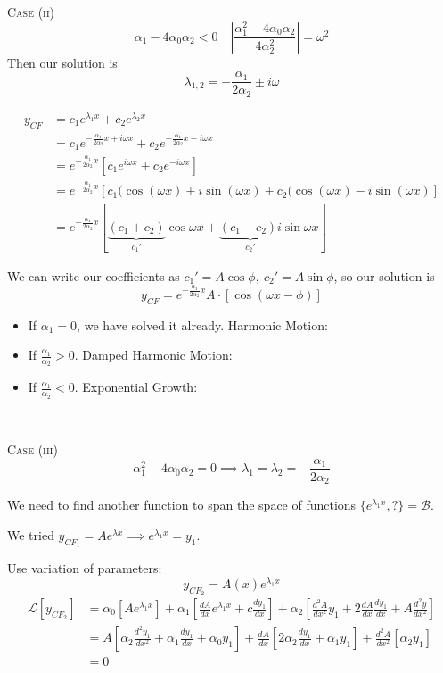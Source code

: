 \documentclass[10pt]{scrartcl}
\begin{document}
\textsc{Case (ii)}
\[\alpha_1-4\alpha_0\alpha_2 < 0 \quad \left|\frac{\alpha_1^2-4\alpha_0\alpha_2}{4\alpha_2^2}\right| = \omega^2\]
Then our solution is
\[\lambda_{1,2} = -\frac{\alpha_1}{2\alpha_2} \pm i\omega\]

\[
\begin{aligned}
  y_{CF} &= c_1e^{\lambda_1x} + c_2e^{\lambda_2x}\\
  &= c_1 e^{-\frac{\alpha_1}{2\alpha_2}x + i\omega x} + c_2 e^{-\frac{\alpha_1}{2\alpha_2}x - i\omega x}\\
  &= e^{-\frac{\alpha_1}{2\alpha_2}x}[c_1e^{i\omega x} + c_2e^{-i\omega x}]\\
  &= e^{-\frac{\alpha_1}{2\alpha_2}x}\left[c_1(\cos(\omega x) + i\sin(\omega x) + c_2(\cos(\omega x) - i\sin(\omega x)\right]\\
  &= e^{-\frac{\alpha_1}{2\alpha_2}x}[\underbrace{(c_1+c_2)}_{c_1'}\cos\omega x + \underbrace{(c_1-c_2)i}_{c_2'}\sin\omega x]
\end{aligned}
\]

We can write our coefficients as $c_1' = A\cos\phi,~c_2' = A\sin\phi$, so our solution is 
\[y_{CF} = e^{-\frac{\alpha_1}{2\alpha_2}x}A\cdot[\cos(\omega x -\phi)]\]

\begin{itemize}
  \item If $\alpha_1 = 0$, we have solved it already. Harmonic Motion:
  \item If $\frac{\alpha_1}{\alpha_2} >0$. Damped Harmonic Motion:
  \item If $\frac{\alpha_1}{\alpha_2} <0$. Exponential Growth: 
\end{itemize}~

\textsc{Case (iii)}
\[\alpha_1^2 -4\alpha_0\alpha_2 = 0 \implies \lambda_1 = \lambda_2 = -\frac{\alpha_1}{2\alpha_2}\]

We need to find another function to span the space of functions $\{e^{\lambda_1x},?\} = \mathcal{B}$. 

We tried $y_{CF_1} = Ae^{\lambda x} \implies e^{\lambda_1 x} = y_1$. 

Use variation of parameters: 
\[y_{CF_2} = A(x)e^{\lambda_1x}\]
\[
\begin{aligned}
  \mathcal{L}[y_{CF_2}] &= \alpha_0[Ae^{\lambda_1x}] + \alpha_1\left[\frac{dA}{dx}e^{\lambda_1x} + c\frac{dy_1}{dx}\right] + \alpha_2\left[\frac{d^2A}{dx^2}y_1 + 2\frac{dA}{dx}\frac{dy_1}{dx} + A\frac{d^2y}{dx^2}\right]\\
  &= A\left[\alpha_2\frac{d^2y_1}{dx^2} + \alpha_1\frac{dy_1}{dx} + \alpha_0y_1\right] + \frac{dA}{dx}\left[2\alpha_2\frac{dy_1}{dx} + \alpha_1y_1\right] + \frac{d^2A}{dx^2}[\alpha_2y_1]\\
  &= 0
\end{aligned}
\]
\end{document}
